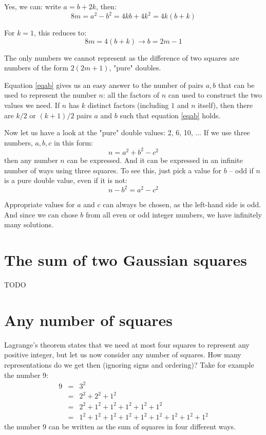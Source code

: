 \documentclass[onecolumn]{article}
\begin{document}
Yes, we can: write $a = b + 2k$, then:
\begin{equation}
    8m = a^2 - b^2 = 4kb + 4k^2 = 4k (b+k)
\end{equation}

For $k = 1$, this reduces to:
\begin{equation}
    8m = 4 (b+k) \rightarrow b = 2m - 1
\end{equation}

The only numbers we cannot represent as the difference of two squares are numbers of the form $2(2m+1)$,
"pure" doubles.

Equation \ref{eqab} gives us an easy answer to the number of pairs $a, b$ that can be used to represent
the number $n$: all the factors of $n$ can used to construct the two values we need. If $n$ has $k$
distinct factors (including $1$ and $n$ itself), then there are $k/2$ or $(k+1)/2$ pairs $a$ and $b$ such that
equation \ref{eqab} holds.

Now let us have a look at the "pure" double values: 2, 6, 10, ... If we use three numbers, $a, b, c$ in this
form:
\begin{equation}
\label{eqabc}
    n = a^2 + b^2 - c^2
\end{equation}
\noindent then any number $n$ can be expressed. And it can be expressed in an infinite number of ways using
three squares. To see this, just pick a value for $b$ -- odd if $n$ is a pure double value, even if it is not:
\begin{equation}
    n - b^2 = a^2 - c^2
\end{equation}

Appropriate values for $a$ and $c$ can always be chosen, as the left-hand side is odd. And since we can chose
$b$ from all even or odd integer numbers, we have infinitely many solutions.

\section{The sum of two Gaussian squares}

TODO

\section{Any number of squares}
Lagrange's theorem states that we need at most four squares to represent any positive integer, but let us now
consider any number of squares. How many representations do we get then (ignoring signs and ordering)? Take
for example the number $9$:
\begin{eqnarray}
    9 &=& 3^2 \\
      &=& 2^2 + 2^2 + 1^2 \\
      &=& 2^2 + 1^2 + 1^2 + 1^2 + 1^2 + 1^2 \\
      &=& 1^2 + 1^2 + 1^2 + 1^2 + 1^2 + 1^2 + 1^2 + 1^2 + 1^2
\end{eqnarray}
%
\noindent the number $9$ can be written as the sum of squares in four different ways.
\end{document}
